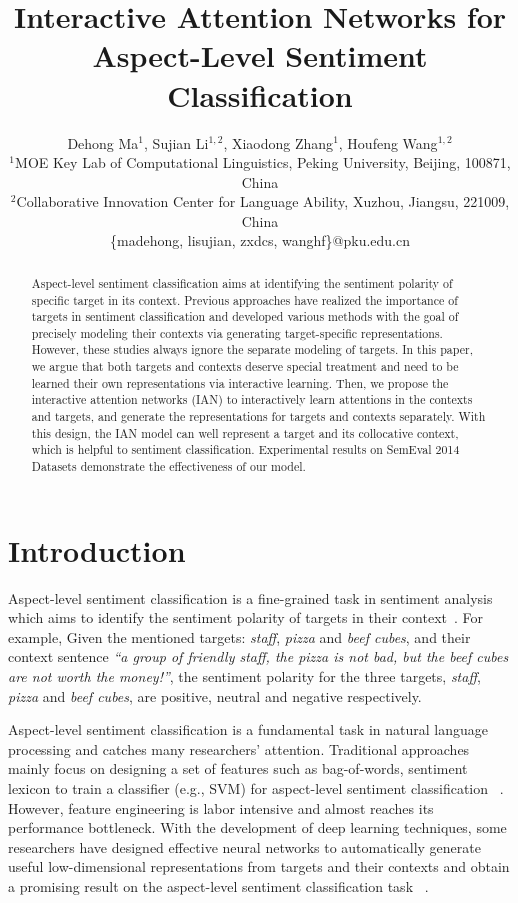\documentclass{article}
\title{Interactive Attention Networks for Aspect-Level Sentiment Classification}
\author{Dehong Ma$^1$, Sujian Li$^{1,2}$, Xiaodong Zhang$^{1}$, Houfeng Wang$^{1,2}$\\ 
$^1$MOE Key Lab of Computational Linguistics, Peking University, Beijing, 100871, China \\
$^2$Collaborative Innovation Center for Language Ability, Xuzhou, Jiangsu, 221009, China\\
\{madehong, lisujian, zxdcs, wanghf\}@pku.edu.cn}
\begin{document}
\maketitle

\begin{abstract}
Aspect-level sentiment classification aims at identifying the sentiment polarity of specific target in its context.
Previous approaches have realized the importance of targets in sentiment classification and developed various methods with the goal of precisely modeling their contexts via generating  target-specific representations.
However, these studies always ignore the separate modeling of targets.
In this paper, we argue that both targets and contexts deserve special treatment and need to be learned their own representations via interactive learning.
Then, we propose the  interactive attention networks (IAN) to interactively learn attentions in the contexts and targets, and generate the representations for targets and contexts separately.
With this design, the IAN model can well represent a target and its collocative context, which is helpful to sentiment classification.
Experimental results on SemEval 2014 Datasets demonstrate the effectiveness of our model.
\end{abstract}

\section{Introduction}
\label{section:intro}
Aspect-level sentiment classification is a fine-grained task in
sentiment analysis which aims to identify the sentiment polarity of 
targets in their context~\cite{INR-011,liu2012sentiment}. 
For example, 
Given the mentioned targets: \emph{staff}, \emph{pizza} and \emph{beef cubes}, and
their context sentence \emph{ ``a group of friendly staff, the pizza is not bad,
but the beef cubes are not worth the money!''}, 
the sentiment polarity for the three targets, \emph{staff}, \emph{pizza} and \emph{beef cubes}, are positive, neutral and negative respectively.

Aspect-level sentiment classification is a fundamental task in natural language processing and catches many researchers' attention. 
Traditional approaches mainly focus on designing a set of
features such as bag-of-words, sentiment lexicon to train a
classifier (e.g., SVM) for aspect-level sentiment classification
~\cite{jiang2011target,perez2012learning}.
However, feature engineering is labor intensive and almost reaches its performance bottleneck.
With the development of deep learning techniques, some
researchers have designed effective neural networks to
automatically generate useful low-dimensional representations from targets and their contexts and obtain a promising
result on the aspect-level sentiment classification task
~\cite{dong2014adaptive,vo2015target,wang2016attention,tang2016aspect}.
\end{document}
